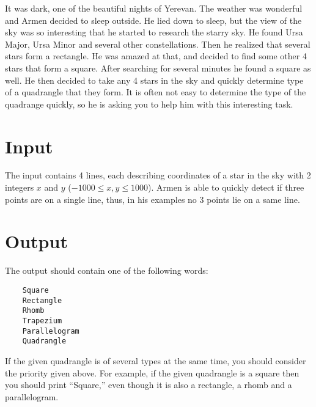 
It was dark, one of the beautiful nights of Yerevan.
The weather was wonderful and Armen decided to sleep outside.
He lied down to sleep, but the view of the sky was so interesting that he started to research the starry sky.
He found Ursa Major, Ursa Minor and several other constellations.
Then he realized that several stars form a rectangle.
He was amazed at that, and decided to find some other 4 stars that form a square.
After searching for several minutes he found a square as well.
He then decided to take any 4 stars in the sky and quickly determine type of a quadrangle that they form.
It is often not easy to determine the type of the quadrange quickly, so he is asking you to help him with this interesting task.

\section*{Input}
The input contains 4 lines, each describing coordinates of a star in the sky with 2 integers $x$ and $y$ ($-1000 \leq x, y \leq 1000$).
Armen is able to quickly detect if three points are on a single line, thus, in his examples no 3 points lie on a same line.

\section*{Output}
The output should contain one of the following words:
\begin{verbatim}
    Square
    Rectangle
    Rhomb
    Trapezium
    Parallelogram
    Quadrangle
\end{verbatim}
If the given quadrangle is of several types at the same time, you should consider the priority given above.
For example, if the given quadrangle is a square then you should print ``Square,'' even though it is also a rectangle, a rhomb and a parallelogram.
